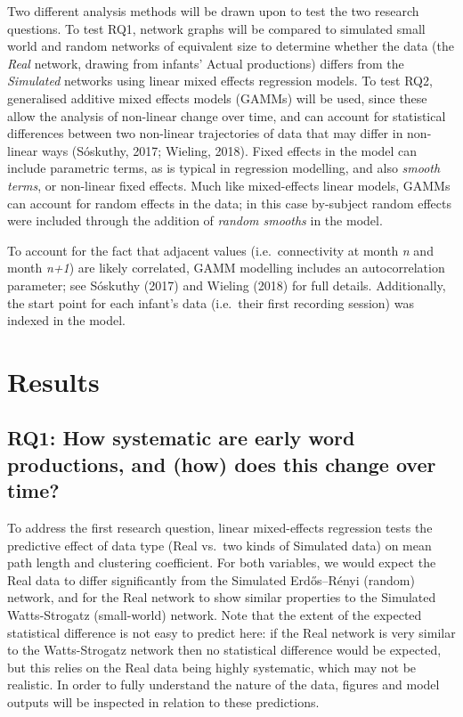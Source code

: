\documentclass[
  man]{apa6}
\begin{document}
Two different analysis methods will be drawn upon to test the two research questions. To test RQ1, network graphs will be compared to simulated small world and random networks of equivalent size to determine whether the data (the \emph{Real} network, drawing from infants' Actual productions) differs from the \emph{Simulated} networks using linear mixed effects regression models. To test RQ2, generalised additive mixed effects models (GAMMs) will be used, since these allow the analysis of non-linear change over time, and can account for statistical differences between two non-linear trajectories of data that may differ in non-linear ways (Sóskuthy, 2017; Wieling, 2018). Fixed effects in the model can include parametric terms, as is typical in regression modelling, and also \emph{smooth terms}, or non-linear fixed effects. Much like mixed-effects linear models, GAMMs can account for random effects in the data; in this case by-subject random effects were included through the addition of \emph{random smooths} in the model.

To account for the fact that adjacent values (i.e.~connectivity at month \emph{n} and month \emph{n+1}) are likely correlated, GAMM modelling includes an autocorrelation parameter; see Sóskuthy (2017) and Wieling (2018) for full details. Additionally, the start point for each infant's data (i.e.~their first recording session) was indexed in the model.

\section{Results}\label{results}

\subsection{RQ1: How systematic are early word productions, and (how) does this change over time?}\label{rq1-how-systematic-are-early-word-productions-and-how-does-this-change-over-time}

To address the first research question, linear mixed-effects regression tests the predictive effect of data type (Real vs.~two kinds of Simulated data) on mean path length and clustering coefficient. For both variables, we would expect the Real data to differ significantly from the Simulated Erdős--Rényi (random) network, and for the Real network to show similar properties to the Simulated Watts-Strogatz (small-world) network. Note that the extent of the expected statistical difference is not easy to predict here: if the Real network is very similar to the Watts-Strogatz network then no statistical difference would be expected, but this relies on the Real data being highly systematic, which may not be realistic. In order to fully understand the nature of the data, figures and model outputs will be inspected in relation to these predictions.
\end{document}
